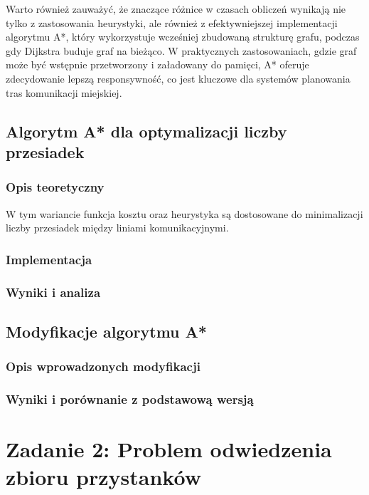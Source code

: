 \documentclass[12pt,a4paper]{article}
\begin{document}
Warto również zauważyć, że znaczące różnice w czasach obliczeń wynikają nie tylko z zastosowania heurystyki, ale również z efektywniejszej implementacji algorytmu A*, który wykorzystuje wcześniej zbudowaną strukturę grafu, podczas gdy Dijkstra buduje graf na bieżąco. W praktycznych zastosowaniach, gdzie graf może być wstępnie przetworzony i załadowany do pamięci, A* oferuje zdecydowanie lepszą responsywność, co jest kluczowe dla systemów planowania tras komunikacji miejskiej.

\subsection{Algorytm A* dla optymalizacji liczby przesiadek}
\subsubsection{Opis teoretyczny}
W tym wariancie funkcja kosztu oraz heurystyka są dostosowane do minimalizacji liczby przesiadek między liniami komunikacyjnymi.

\subsubsection{Implementacja}

\subsubsection{Wyniki i analiza}

\subsection{Modyfikacje algorytmu A*}
\subsubsection{Opis wprowadzonych modyfikacji}

\subsubsection{Wyniki i porównanie z podstawową wersją}

\section{Zadanie 2: Problem odwiedzenia zbioru przystanków}
\end{document}
